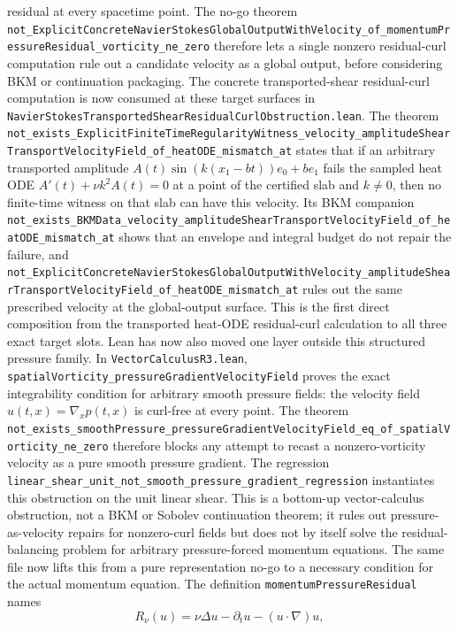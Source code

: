 \documentclass[11pt]{article}
\begin{document}
residual at every spacetime point.  The no-go theorem
\texttt{not\_ExplicitConcreteNavierStokesGlobalOutputWithVelocity\_of\_momentumPressureResidual\_vorticity\_ne\_zero}
therefore lets a single nonzero residual-curl computation rule out a candidate
velocity as a global output, before considering BKM or continuation packaging.
The concrete transported-shear residual-curl computation is now consumed at
these target surfaces in
\texttt{NavierStokesTransportedShearResidualCurlObstruction.lean}.  The theorem
\texttt{not\_exists\_ExplicitFiniteTimeRegularityWitness\_velocity\_amplitudeShearTransportVelocityField\_of\_heatODE\_mismatch\_at}
states that if an arbitrary transported amplitude \(A(t)\sin(k(x_1-bt))e_0+be_1\)
fails the sampled heat ODE \(A'(t)+\nu k^2A(t)=0\) at a point of the certified
slab and \(k\neq0\), then no finite-time witness on that slab can have this
velocity.  Its BKM companion
\texttt{not\_exists\_BKMData\_velocity\_amplitudeShearTransportVelocityField\_of\_heatODE\_mismatch\_at}
shows that an envelope and integral budget do not repair the failure, and
\texttt{not\_ExplicitConcreteNavierStokesGlobalOutputWithVelocity\_amplitudeShearTransportVelocityField\_of\_heatODE\_mismatch\_at}
rules out the same prescribed velocity at the global-output surface.  This is
the first direct composition from the transported heat-ODE residual-curl
calculation to all three exact target slots.
Lean has now also moved one layer outside this structured pressure family.  In
\texttt{VectorCalculusR3.lean},
\texttt{spatialVorticity\_pressureGradientVelocityField} proves the exact
integrability condition for arbitrary smooth pressure fields: the velocity
field \(u(t,x)=\nabla_x p(t,x)\) is curl-free at every point.  The theorem
\texttt{not\_exists\_smoothPressure\_pressureGradientVelocityField\_eq\_of\_spatialVorticity\_ne\_zero}
therefore blocks any attempt to recast a nonzero-vorticity velocity as a pure
smooth pressure gradient.  The regression
\texttt{linear\_shear\_unit\_not\_smooth\_pressure\_gradient\_regression}
instantiates this obstruction on the unit linear shear.  This is a
bottom-up vector-calculus obstruction, not a BKM or Sobolev continuation
theorem; it rules out pressure-as-velocity repairs for nonzero-curl fields but
does not by itself solve the residual-balancing problem for arbitrary
pressure-forced momentum equations.
The same file now lifts this from a pure representation no-go to a necessary
condition for the actual momentum equation.  The definition
\texttt{momentumPressureResidual} names
\[
  R_\nu(u)=\nu\Delta u-\partial_tu-(u\cdot\nabla)u,
\]
\end{document}
